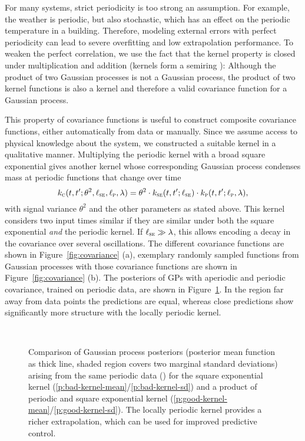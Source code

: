 For many systems, strict periodicity is too strong an assumption. For example,
the weather is periodic, but also stochastic, which has an effect on the
periodic temperature in a building. Therefore, modeling external errors with
perfect periodicity can lead to severe overfitting and low extrapolation
performance. To weaken the perfect correlation, we use the fact that the kernel
property is closed under multiplication and addition (\ie kernels form a
semi\-ring \cite[.4]{Rasmussen.Williams:2006:Gaussian}): Although the
product of two Gaussian processes is not a Gaussian process, the product of two
kernel functions is also a kernel and therefore a valid covariance function for
a Gaussian process.

This property of covariance functions is useful to construct composite
covariance functions, either automatically from data
\cite{Duvenaud.Lloyd.ea:2013:Structure} or manually. Since we assume access to
physical knowledge about the system, we constructed a suitable kernel in a
qualitative manner. Multiplying the periodic kernel with a broad
square exponential gives another kernel whose corresponding Gaussian process
condenses mass at periodic functions that change over time
\begin{equation}
\label{eq:comp-kernel}
k_\mathsc{c}(t,t';\theta^2,\ell_\mathsc{se},\ell_\mathsc{p},\lambda) = \theta^2
\cdot
k_{\mathsc{se}}(t,t';\ell_\mathsc{se})
\cdot k_\mathsc{p}(t,t';\ell_\mathsc{p},\lambda),
\end{equation}
with signal variance $\theta^2$ and the other parameters as stated above. This
kernel considers two input times similar if they are similar under both the
square exponential \emph{and} the periodic kernel. If $\ell_{\normalfont\textsc{se}} \gg
\lambda$, this allows encoding a decay in the covariance over several
oscillations. The different covariance functions are shown in
Figure~\ref{fig:covariance} (a), exemplary randomly sampled functions from
Gaussian processes with those covariance functions are shown in
Figure~\ref{fig:covariance} (b). The posteriors of GPs with aperiodic and
periodic covariance, trained on periodic data, are shown in
Figure~\ref{fig:kernels}. In the region far away from data points the
predictions are equal, whereas close predictions show significantly more
structure with the locally periodic kernel.

\begin{figure}
\centering%
\footnotesize%
\\
\caption[Comparison of Gaussian process posteriors for structured
extrapolation.]{Comparison of Gaussian process posteriors (posterior mean
function as thick line, shaded region covers two marginal standard deviations)
arising from the same periodic data () for the
square exponential kernel (\ref*{p:bad-kernel-mean}/\ref*{p:bad-kernel-sd}) and
a product of periodic and square exponential kernel
(\ref*{p:good-kernel-mean}/\ref*{p:good-kernel-sd}). The locally periodic kernel
provides a richer extrapolation, which can be used for improved predictive
control.}
\label{fig:kernels}
\end{figure}

